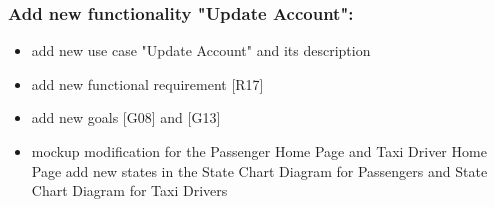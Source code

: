 \subsubsection{Add new functionality "Update Account":}
\begin{itemize}
	\item add new use case "Update Account" and its description
	\item add new functional requirement [R17]
	\item add new goals [G08] and [G13]
	\item mockup modification for the Passenger Home Page and Taxi Driver Home Page
add new states in the State Chart Diagram for Passengers and State Chart Diagram for Taxi Drivers
\end{itemize}

